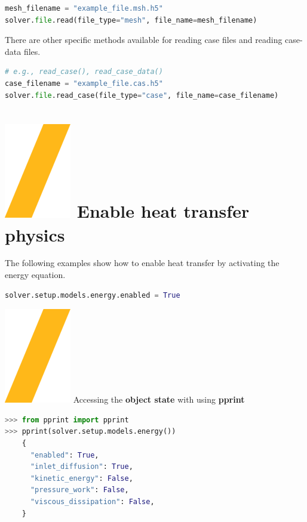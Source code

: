 \documentclass[9pt,landscape]{article}
\begin{document}
\begin{multicols}{3}
\begin{lstlisting}[language=Python]
mesh_filename = "example_file.msh.h5"
solver.file.read(file_type="mesh", file_name=mesh_filename)
\end{lstlisting}

There are other specific methods available for reading case files and
reading case-data files. 

\begin{lstlisting}[language=Python]
# e.g., read_case(), read_case_data()
case_filename = "example_file.cas.h5"
solver.file.read_case(file_type="case", file_name=case_filename)
\end{lstlisting}


\section{\includegraphics[height=\fontcharht\font`\S]{slash.png} Enable heat transfer physics}

The following examples show how to enable heat transfer by activating the energy equation.

\begin{lstlisting}[language=Python]
solver.setup.models.energy.enabled = True
\end{lstlisting}

{\includegraphics[height=\fontcharht\font`\S]{slash.png} Accessing the \textbf{object state} with using \textbf{pprint}

\begin{lstlisting}[language=Python]
>>> from pprint import pprint
>>> pprint(solver.setup.models.energy())
    {
      "enabled": True,
      "inlet_diffusion": True,
      "kinetic_energy": False,
      "pressure_work": False,
      "viscous_dissipation": False,
    }
\end{lstlisting}


}
\end{multicols}
\end{document}
